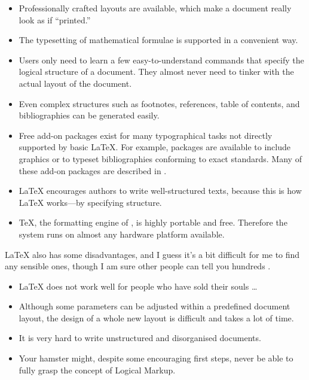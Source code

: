 \begin{itemize}

  \item Professionally crafted layouts are available, which make a
        document really look as if ``printed.''
  \item The typesetting of mathematical formulae is supported in a
        convenient way.
  \item Users only need to learn a few easy-to-understand commands
        that specify the logical structure of a document. They almost never
        need to tinker with the actual layout of the document.
  \item Even complex structures such as footnotes, references, table of
        contents, and bibliographies can be generated easily.
  \item Free add-on packages exist for many typographical tasks not directly supported by basic
        \LaTeX. For example, packages are
        available to include \PSi{} graphics or to typeset
        bibliographies conforming to exact standards. Many of these add-on
        packages are described in \companion.
  \item \LaTeX{} encourages authors to write well-structured texts,
        because this is how \LaTeX{} works---by specifying structure.
  \item \TeX, the formatting engine of \LaTeXe, is highly portable and free.
        Therefore the system runs on almost any hardware platform
        available.

\end{itemize}

\medskip

\noindent\LaTeX{} also has some disadvantages, and I guess it's a bit
difficult for me to find any sensible ones, though I am sure other people
can tell you hundreds \smiley.

\begin{itemize}
  \item \LaTeX{} does not work well for people who have sold their
        souls \ldots
  \item Although some parameters can be adjusted within a predefined
        document layout, the design of a whole new layout is difficult and
        takes a lot of time.
  \item It is very hard to write unstructured and disorganised documents.
  \item Your hamster might, despite some encouraging first steps, never be
        able to fully grasp the concept of Logical Markup.
\end{itemize}

